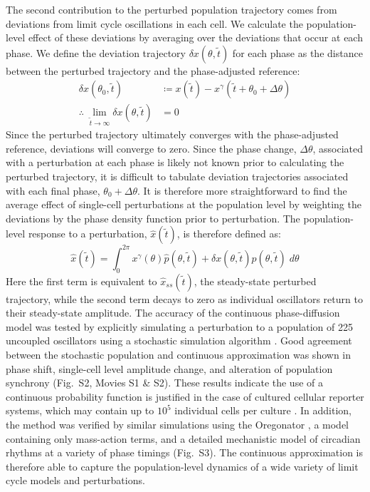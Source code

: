 \documentclass[11pt, letterpaper]{article}
\begin{document}
The second contribution to the perturbed population trajectory comes from deviations from limit cycle oscillations in each cell.
We calculate the population-level effect of these deviations by averaging over the deviations that occur at each phase.
We define the deviation trajectory $\delta x(\theta, \tilde{t})$ for each phase as the distance between the perturbed trajectory and the phase-adjusted reference:
\begin{align}
  \delta x(\theta_0, \tilde{t}) &\coloneqq x(\tilde{t}) - x^\gamma(\tilde{t} + \theta_0 + \Delta \theta) \\
  \therefore\; \lim_{\tilde{t} \to \infty} \delta x(\theta, \tilde{t}) &= 0
\end{align}
Since the perturbed trajectory ultimately converges with the phase-adjusted reference, deviations will converge to zero.
Since the phase change, $\Delta\theta$, associated with a perturbation at each phase is likely not known prior to calculating the perturbed trajectory, it is difficult to tabulate deviation trajectories associated with each final phase, $\theta_0 + \Delta\theta$.
It is therefore more straightforward to find the average effect of single-cell perturbations at the population level by weighting the deviations by the phase density function prior to perturbation.
The population-level response to a perturbation, $\hat{x}(\tilde{t})$, is therefore defined as:
\begin{equation}
  \hat{x}(\tilde{t}) = \int_0^{2\pi} x^\gamma(\theta)\hat{p}(\theta, \tilde{t}) + \delta x(\theta, \tilde{t})p(\theta, \tilde{t}) \; d\theta
\end{equation}
Here the first term is equivalent to $\hat{x}_{ss}(\tilde{t})$, the steady-state perturbed trajectory, while the second term decays to zero as individual oscillators return to their steady-state amplitude.
The accuracy of the continuous phase-diffusion model was tested by explicitly simulating a perturbation to a population of 225 uncoupled oscillators using a stochastic simulation algorithm \cite{Gillespie1977, Sanft2011a}.
Good agreement between the stochastic population and continuous approximation was shown in phase shift, single-cell level amplitude change, and alteration of population synchrony (Fig.~S2, Movies S1 \& S2).
These results indicate the use of a continuous probability function is justified in the case of cultured cellular reporter systems, which may contain up to $10^5$ individual cells per culture \cite{Welsh2004}.
In addition, the method was verified by similar simulations using the Oregonator \cite{Field1974}, a model containing only mass-action terms, and a detailed mechanistic model of circadian rhythms \cite{Hirota2012} at a variety of phase timings (Fig.~S3).
The continuous approximation is therefore able to capture the population-level dynamics of a wide variety of limit cycle models and perturbations.
\end{document}

